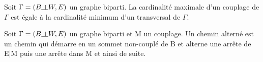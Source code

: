 \begin{thrm}[König]
Soit $\Gamma = (B \vmodels W, E)$ un graphe biparti. La cardinalité maximale d'un couplage de $\Gamma$ est égale à la cardinalité minimum d'un transversal de $\Gamma$.
\end{thrm}

\begin{exmp}

\end{exmp}



\newpage

\begin{defn}
Soit $\Gamma = (B \vmodels W, E)$ un graphe biparti et M un couplage. Un chemin alterné est un chemin qui démarre en un sommet non-couplé de B et alterne une arrête de E|M puis une arrête dans M et ainsi de suite.
\end{defn}

\begin{exmp}

\end{exmp}



